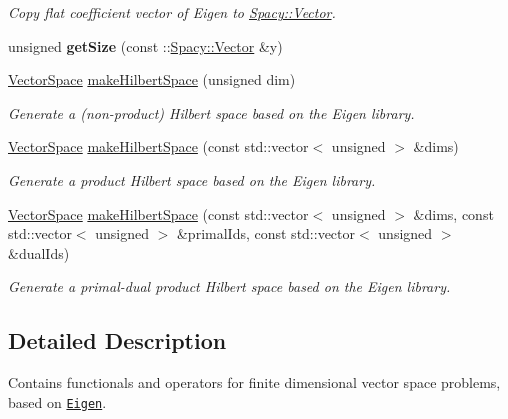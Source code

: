 \begin{DoxyCompactItemize}
\begin{DoxyCompactList}\small\item\em \-Copy flat coefficient vector of \-Eigen to \hyperlink{classSpacy_1_1Vector}{\-Spacy\-::\-Vector}. \end{DoxyCompactList}\item 
\hypertarget{namespaceSpacy_1_1Rn_a3f36c8bb8bdede3ff8573631ee7f3e79}{unsigned {\bfseries get\-Size} (const \-::\hyperlink{classSpacy_1_1Vector}{\-Spacy\-::\-Vector} \&y)}\label{namespaceSpacy_1_1Rn_a3f36c8bb8bdede3ff8573631ee7f3e79}

\item 
\hyperlink{classSpacy_1_1VectorSpace}{\-Vector\-Space} \hyperlink{namespaceSpacy_1_1Rn_abadd5b9e11793fdb2f689a3ee908e5e7}{make\-Hilbert\-Space} (unsigned dim)
\begin{DoxyCompactList}\small\item\em \-Generate a (non-\/product) \-Hilbert space based on the \-Eigen library. \end{DoxyCompactList}\item 
\hypertarget{namespaceSpacy_1_1Rn_a4e9d4ebff60dde8a465a464531af13e1}{\hyperlink{classSpacy_1_1VectorSpace}{\-Vector\-Space} \hyperlink{namespaceSpacy_1_1Rn_a4e9d4ebff60dde8a465a464531af13e1}{make\-Hilbert\-Space} (const std\-::vector$<$ unsigned $>$ \&dims)}\label{namespaceSpacy_1_1Rn_a4e9d4ebff60dde8a465a464531af13e1}

\begin{DoxyCompactList}\small\item\em \-Generate a product \-Hilbert space based on the \-Eigen library. \end{DoxyCompactList}\item 
\hypertarget{namespaceSpacy_1_1Rn_a5df449d080e704158ff479c36634ee74}{\hyperlink{classSpacy_1_1VectorSpace}{\-Vector\-Space} \hyperlink{namespaceSpacy_1_1Rn_a5df449d080e704158ff479c36634ee74}{make\-Hilbert\-Space} (const std\-::vector$<$ unsigned $>$ \&dims, const std\-::vector$<$ unsigned $>$ \&primal\-Ids, const std\-::vector$<$ unsigned $>$ \&dual\-Ids)}\label{namespaceSpacy_1_1Rn_a5df449d080e704158ff479c36634ee74}

\begin{DoxyCompactList}\small\item\em \-Generate a primal-\/dual product \-Hilbert space based on the \-Eigen library. \end{DoxyCompactList}\end{DoxyCompactItemize}


\subsection{\-Detailed \-Description}
\-Contains functionals and operators for finite dimensional vector space problems, based on \href{http://eigen.tuxfamily.org}{\tt \-Eigen}. 

